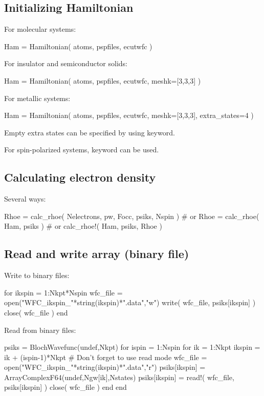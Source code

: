 \subsection*{Initializing Hamiltonian}

For molecular systems:
\begin{juliacode}
Ham = Hamiltonian( atoms, pspfiles, ecutwfc )
\end{juliacode}

For insulator and semiconductor solids:
\begin{juliacode}
Ham = Hamiltonian( atoms, pspfiles, ecutwfc, meshk=[3,3,3] )
\end{juliacode}

For metallic systems:
\begin{juliacode}
Ham = Hamiltonian( atoms, pspfiles, ecutwfc, meshk=[3,3,3], extra_states=4 )
\end{juliacode}

Empty extra states can be specified by using  keyword.

For spin-polarized systems,  keyword can be used.



\subsection*{Calculating electron density}

Several ways:
\begin{juliacode}
Rhoe = calc_rhoe( Nelectrons, pw, Focc, psiks, Nspin )
# or
Rhoe = calc_rhoe( Ham, psiks )
# or
calc_rhoe!( Ham, psiks, Rhoe )
\end{juliacode}

\subsection*{Read and write array (binary file)}

Write to binary files:
\begin{juliacode}
for ikspin = 1:Nkpt*Nspin
    wfc_file = open("WFC_ikspin_"*string(ikspin)*".data","w")
    write( wfc_file, psiks[ikspin] )
    close( wfc_file )
end
\end{juliacode}

Read from binary files:
\begin{juliacode}
psiks = BlochWavefunc(undef,Nkpt)
for ispin = 1:Nspin
for ik = 1:Nkpt
    ikspin = ik + (ispin-1)*Nkpt
    # Don't forget to use read mode
    wfc_file = open("WFC_ikspin_"*string(ikspin)*".data","r")
    psiks[ikspin] = Array{ComplexF64}(undef,Ngw[ik],Nstates)
    psiks[ikspin] = read!( wfc_file, psiks[ikspin] )
    close( wfc_file )
end
end
\end{juliacode}




